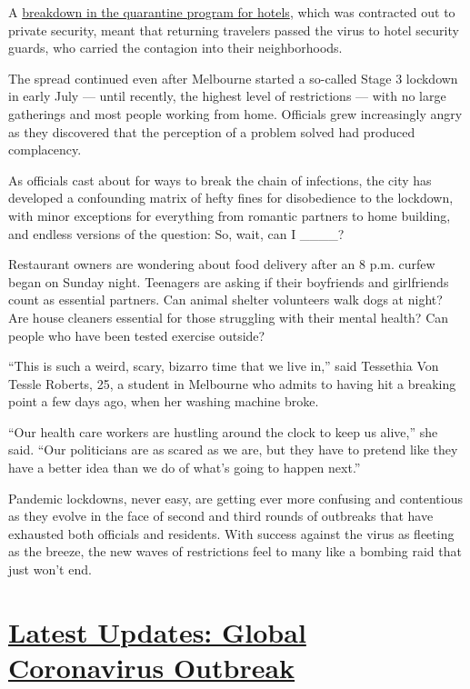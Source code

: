 A
\href{https://www.theage.com.au/national/victoria/how-hotel-quarantine-let-covid-19-out-of-the-bag-in-victoria-20200703-p558og.html}{breakdown
in the quarantine program for hotels}, which was contracted out to
private security, meant that returning travelers passed the virus to
hotel security guards, who carried the contagion into their
neighborhoods.

The spread continued even after Melbourne started a so-called Stage 3
lockdown in early July --- until recently, the highest level of
restrictions --- with no large gatherings and most people working from
home. Officials grew increasingly angry as they discovered that the
perception of a problem solved had produced complacency.

As officials cast about for ways to break the chain of infections, the
city has developed a confounding matrix of hefty fines for disobedience
to the lockdown, with minor exceptions for everything from romantic
partners to home building, and endless versions of the question: So,
wait, can I \_\_\_\_?

Restaurant owners are wondering about food delivery after an 8 p.m.
curfew began on Sunday night. Teenagers are asking if their boyfriends
and girlfriends count as essential partners. Can animal shelter
volunteers walk dogs at night? Are house cleaners essential for those
struggling with their mental health? Can people who have been tested
exercise outside?

``This is such a weird, scary, bizarro time that we live in,'' said
Tessethia Von Tessle Roberts, 25, a student in Melbourne who admits to
having hit a breaking point a few days ago, when her washing machine
broke.

``Our health care workers are hustling around the clock to keep us
alive,'' she said. ``Our politicians are as scared as we are, but they
have to pretend like they have a better idea than we do of what's going
to happen next.''

Pandemic lockdowns, never easy, are getting ever more confusing and
contentious as they evolve in the face of second and third rounds of
outbreaks that have exhausted both officials and residents. With success
against the virus as fleeting as the breeze, the new waves of
restrictions feel to many like a bombing raid that just won't end.

\hypertarget{latest-updates-global-coronavirus-outbreak}{%
\section{\texorpdfstring{\href{https://www.nytimes.com/2020/08/04/world/coronavirus-cases.html?action=click\&pgtype=Article\&state=default\&region=MAIN_CONTENT_1\&context=storylines_live_updates}{Latest
Updates: Global Coronavirus
Outbreak}}{Latest Updates: Global Coronavirus Outbreak}}\label{latest-updates-global-coronavirus-outbreak}}

